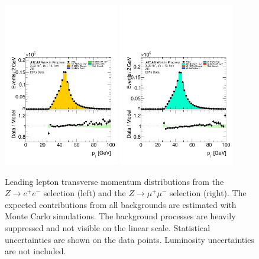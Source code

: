 
\begin{figure}[htbp]
\centering
\includegraphics[width=0.45\textwidth]{figures/ZR/dataMc-lep_0_pt-ZR-el.pdf}
\includegraphics[width=0.45\textwidth]{figures/ZR/dataMc-lep_0_pt-ZR-mu.pdf}
\caption{
Leading lepton transverse momentum distributions from the $Z \rightarrow e^+e^-$ selection (left) and the $Z \rightarrow \mu^+\mu^-$  selection (right).
The expected contributions from all backgrounds are estimated with Monte Carlo simulations.
The background processes are heavily suppressed and not visible on the linear scale. 
Statistical uncertainties are shown on the data points.
Luminosity uncertainties are not included.
}
\label{fig:ZR_lep_0_pt}
\end{figure}

